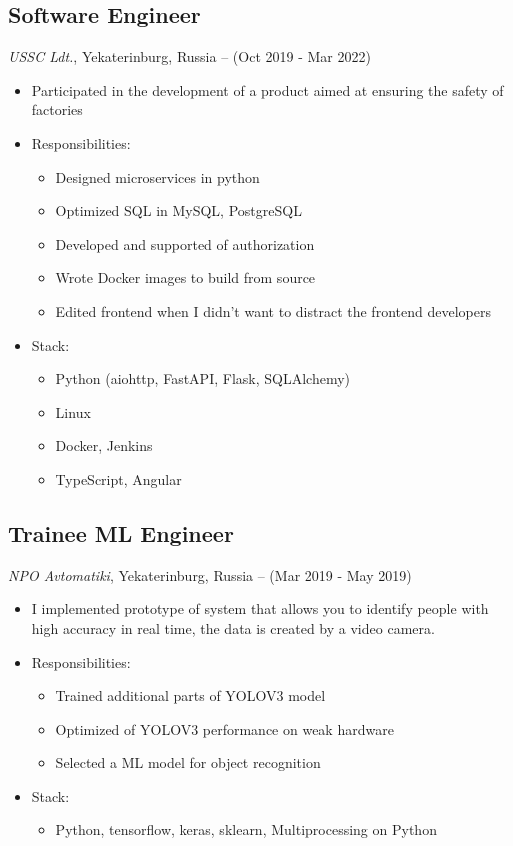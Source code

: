 \documentclass{article}
\begin{document}
\subsection*{Software Engineer}
\textit{USSC Ldt.}, Yekaterinburg, Russia – (Oct 2019 - Mar 2022)
\begin{itemize}
    \item Participated in the development of a product aimed at ensuring the safety of factories
    \item Responsibilities:
    \begin{itemize}
        \item Designed microservices in python
        \item Optimized SQL in MySQL, PostgreSQL
        \item Developed and supported of authorization
        \item Wrote Docker images to build from source
        \item Edited frontend when I didn't want to distract the frontend developers
    \end{itemize}
    \item Stack:
    \begin{itemize}
        \item Python (aiohttp, FastAPI, Flask, SQLAlchemy)
        \item Linux
        \item Docker, Jenkins
        \item TypeScript, Angular
    \end{itemize}
\end{itemize}

\subsection*{Trainee ML Engineer}
\textit{NPO Avtomatiki}, Yekaterinburg, Russia – (Mar 2019 - May 2019)
\begin{itemize}
    \item I implemented prototype of system that allows you to identify people with high accuracy in real time, the data is created by a video camera.
    \item Responsibilities:
    \begin{itemize}
        \item Trained additional parts of YOLOV3 model
        \item Optimized of YOLOV3 performance on weak hardware
        \item Selected a ML model for object recognition
    \end{itemize}
    \item Stack:
    \begin{itemize}
        \item Python, tensorflow, keras, sklearn, Multiprocessing on Python
    \end{itemize}
\end{itemize}
\end{document}
